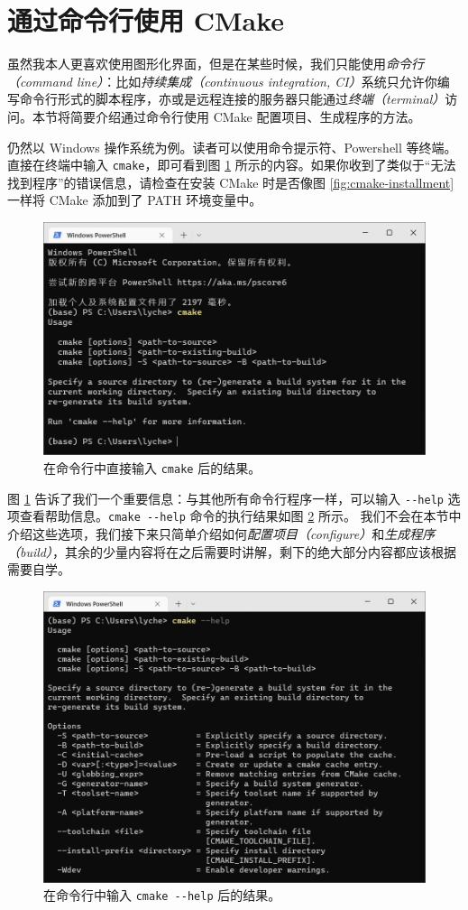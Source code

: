 
\section{通过命令行使用 CMake}

虽然我本人更喜欢使用图形化界面，但是在某些时候，我们只能使用\emph{命令行（command line）}：比如\emph{持续集成（continuous integration, CI）}系统只允许你编写命令行形式的脚本程序，亦或是远程连接的服务器只能通过\emph{终端（terminal）}访问。本节将简要介绍通过命令行使用 CMake 配置项目、生成程序的方法。

仍然以 Windows 操作系统为例。读者可以使用命令提示符、Powershell 等终端。直接在终端中输入 \lstinline[language={}]{cmake}，即可看到图 \ref{fig:cmd-1} 所示的内容。如果你收到了类似于“无法找到程序”的错误信息，请检查在安装 CMake 时是否像图 \ref{fig:cmake-installment} 一样将 CMake 添加到了 PATH 环境变量中。

\begin{figure}[H]
	\centering
	\includegraphics[width=0.8\linewidth]{assets/cmd-1}
	\caption{在命令行中直接输入 \lstinline[language={}]{cmake} 后的结果。}
	\label{fig:cmd-1}
\end{figure}

图 \ref{fig:cmd-1} 告诉了我们一个重要信息：与其他所有命令行程序一样，可以输入 \lstinline[language={}]{--help} 选项查看帮助信息。\lstinline[language={}]{cmake --help} 命令的执行结果如图 \ref{fig:cmd-2} 所示。
我们不会在本节中介绍这些选项，我们接下来只简单介绍如何\emph{配置项目（configure）}和\emph{生成程序（build）}，其余的少量内容将在之后需要时讲解，剩下的绝大部分内容都应该根据需要自学。

\begin{figure}[H]
	\centering
	\includegraphics[width=0.8\linewidth]{assets/cmd-2}
	\caption{在命令行中输入 \lstinline[language={}]{cmake --help} 后的结果。}
	\label{fig:cmd-2}
\end{figure}
